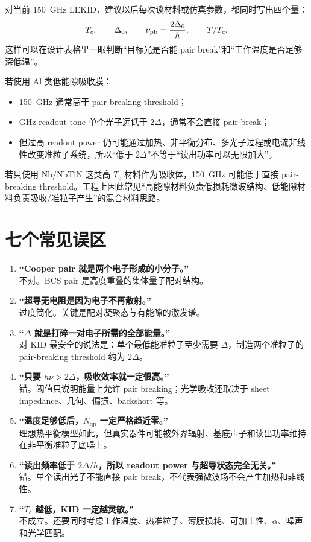 \documentclass[11pt,a4paper,openany]{ctexrep}
\newcommand{\qp}{\mathrm{qp}}
\begin{document}
\begin{projectbox}
对当前 \SI{150}{GHz} LEKID，建议以后每次谈材料或仿真参数，都同时写出四个量：
\[
T_c,\qquad
\Delta_0,\qquad
\nu_{\rm pb}=\frac{2\Delta_0}{h},\qquad
T/T_c.
\]
这样可以在设计表格里一眼判断“目标光是否能 pair break”和“工作温度是否足够深低温”。

若使用 Al 类低能隙吸收膜：
\begin{itemize}
  \item \SI{150}{GHz} 通常高于 pair-breaking threshold；
  \item GHz readout tone 单个光子远低于 $2\Delta$，通常不会直接 pair break；
  \item 但过高 readout power 仍可能通过加热、非平衡分布、多光子过程或电流非线性改变准粒子系统，所以“低于 $2\Delta$”不等于“读出功率可以无限加大”。
\end{itemize}

若只使用 Nb/NbTiN 这类高 $T_c$ 材料作为吸收体，\SI{150}{GHz} 可能低于直接 pair-breaking threshold。工程上因此常见“高能隙材料负责低损耗微波结构、低能隙材料负责吸收/准粒子产生”的混合材料思路。
\end{projectbox}

\section{七个常见误区}

\begin{mistakebox}
\begin{enumerate}
  \item \textbf{“Cooper pair 就是两个电子形成的小分子。”}\\
  不对。BCS pair 是高度重叠的集体量子配对结构。
  \item \textbf{“超导无电阻是因为电子不再散射。”}\\
  过度简化。关键是配对凝聚态与有能隙的激发谱。
  \item \textbf{“$\Delta$ 就是打碎一对电子所需的全部能量。”}\\
  对 KID 最安全的说法是：单个最低能准粒子至少需要 $\Delta$，制造两个准粒子的 pair-breaking threshold 约为 $2\Delta$。
  \item \textbf{“只要 $h\nu>2\Delta$，吸收效率就一定很高。”}\\
  错。阈值只说明能量上允许 pair breaking；光学吸收还取决于 sheet impedance、几何、偏振、backshort 等。
  \item \textbf{“温度足够低后，$N_{\qp}$ 一定严格趋近零。”}\\
  理想热平衡模型如此，但真实器件可能被外界辐射、基底声子和读出功率维持在非平衡准粒子底噪上。
  \item \textbf{“读出频率低于 $2\Delta/h$，所以 readout power 与超导状态完全无关。”}\\
  错。单个读出光子不能直接 pair break，不代表强微波场不会产生加热和非线性。
  \item \textbf{“$T_c$ 越低，KID 一定越灵敏。”}\\
  不成立。还要同时考虑工作温度、热准粒子、薄膜损耗、可加工性、$\alpha$、噪声和光学匹配。
\end{enumerate}
\end{mistakebox}
\end{document}
